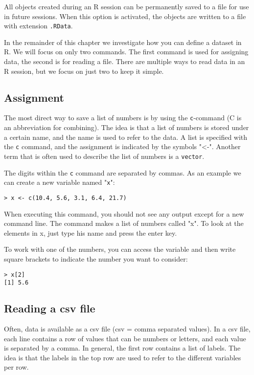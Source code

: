 All objects created during an R session can be permanently saved to a file for use in future sessions. When this option is activated, the objects are written to a file with extension \texttt{.RData}.

In the remainder of this chapter we investigate how you can define a dataset in R. We will focus on only two commands. The first command is used for assigning data, the second is for reading a file. There are multiple ways to read data in an R session, but we focus on just two to keep it simple.


\subsection{Assignment}

The most direct way to save a list of numbers is by using the  \texttt{c}-command (C is an abbreviation for combining).
The idea is that a list of numbers is stored under a certain name, and the name is used to refer to the data.
A list is specified with the \texttt{c} command, and the assignment is indicated by the symbols "<-".
Another term that is often used to describe the list of numbers is a \texttt{vector}.

The digits within the \texttt{c} command are separated by commas. As an example we can create a new variable named "\texttt{x}":
\begin{lstlisting}
> x <- c(10.4, 5.6, 3.1, 6.4, 21.7)
\end{lstlisting}

When executing this command, you should not see any output except for a new command line. The command makes a list of numbers called "x". To look at the elements in x, just type his name and press the enter key.

To work with one of the numbers, you can access the variable and then write square brackets to indicate the number you want to consider:
\begin{lstlisting}
> x[2]
[1] 5.6
\end{lstlisting}

\subsection{Reading a csv file}

Often, data is available as a csv file (csv = comma separated values).
In a csv file, each line contains a row of values that can be numbers or letters, and each value is separated by a comma. 
In general, the first row contains a list of labels. 
The idea is that the labels in the top row are used to refer to the different variables per row.

